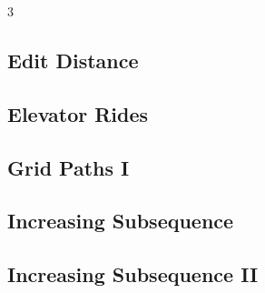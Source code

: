 \documentclass[8pt]{extarticle}
\begin{document}
\begin{multicols*}{3}
\subsection{Edit Distance}
\begin{caixaenunciado}

\end{caixaenunciado}
\vspace{0.3cm}


\subsection{Elevator Rides}
\begin{caixaenunciado}

\end{caixaenunciado}
\vspace{0.3cm}


\subsection{Grid Paths I}
\begin{caixaenunciado}

\end{caixaenunciado}
\vspace{0.3cm}


\subsection{Increasing Subsequence}
\begin{caixaenunciado}

\end{caixaenunciado}
\vspace{0.3cm}


\subsection{Increasing Subsequence II}
\begin{caixaenunciado}

\end{caixaenunciado}
\vspace{0.3cm}



\end{multicols*}
\end{document}
